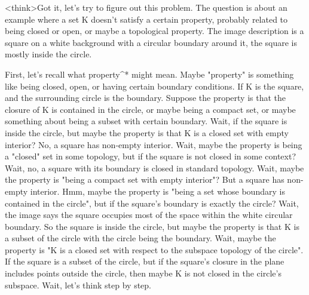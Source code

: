 <think>Got it, let's try to figure out this problem. The question is about an example where a set K doesn't satisfy a certain property, probably related to being closed or open, or maybe a topological property. The image description is a square on a white background with a circular boundary around it, the square is mostly inside the circle. 

First, let's recall what property^* might mean. Maybe "property" is something like being closed, open, or having certain boundary conditions. If K is the square, and the surrounding circle is the boundary. Suppose the property is that the closure of K is contained in the circle, or maybe being a compact set, or maybe something about being a subset with certain boundary. Wait, if the square is inside the circle, but maybe the property is that K is a closed set with empty interior? No, a square has non-empty interior. Wait, maybe the property is being a "closed" set in some topology, but if the square is not closed in some context? Wait, no, a square with its boundary is closed in standard topology. Wait, maybe the property is "being a compact set with empty interior"? But a square has non-empty interior. Hmm, maybe the property is "being a set whose boundary is contained in the circle", but if the square's boundary is exactly the circle? Wait, the image says the square occupies most of the space within the white circular boundary. So the square is inside the circle, but maybe the property is that K is a subset of the circle with the circle being the boundary. Wait, maybe the property is "K is a closed set with respect to the subspace topology of the circle". If the square is a subset of the circle, but if the square's closure in the plane includes points outside the circle, then maybe K is not closed in the circle's subspace. Wait, let's think step by step.

